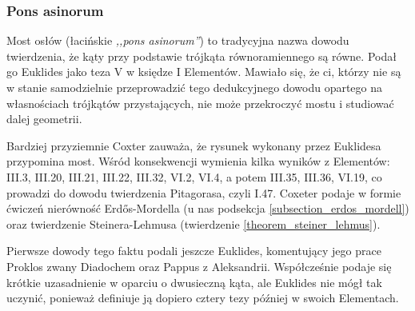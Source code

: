 %


\subsubsection{Pons asinorum}
Most osłów (łacińskie \emph{,,pons asinorum''}) to tradycyjna nazwa dowodu twierdzenia, że kąty przy podstawie trójkąta równoramiennego są równe.
Podał go Euklides jako teza V w księdze I Elementów.
Mawiało się, że ci, którzy nie są w stanie samodzielnie przeprowadzić tego dedukcyjnego dowodu opartego na własnościach trójkątów przystających, nie może przekroczyć mostu i studiować dalej geometrii.

Bardziej przyziemnie Coxter \cite[s. 6-9]{coxeter_1991} zauważa, że rysunek wykonany przez Euklidesa przypomina most.
Wśród konsekwencji wymienia kilka wyników z Elementów: III.3, III.20, III.21, III.22, III.32, VI.2, VI.4, a potem III.35, III.36, VI.19, co prowadzi do dowodu twierdzenia Pitagorasa, czyli I.47. %
%
Coxeter podaje w formie ćwiczeń nierówność Erdős-Mordella (u nas podsekcja \ref{subsection_erdos_mordell}) oraz twierdzenie Steinera-Lehmusa (twierdzenie \ref{theorem_steiner_lehmus}).

Pierwsze dowody tego faktu podali jeszcze Euklides, komentujący jego prace Proklos zwany Diadochem oraz Pappus z Aleksandrii.
Współcześnie podaje się krótkie uzasadnienie w oparciu o dwusieczną kąta, ale Euklides nie mógł tak uczynić, ponieważ definiuje ją dopiero cztery tezy później w swoich Elementach.



%